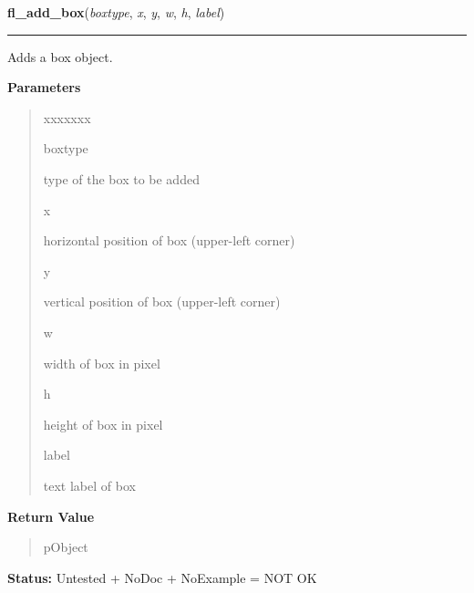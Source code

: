     \label{xformslib:library:fl_add_box}

    \vspace{0.5ex}

\hspace{.8\funcindent}\begin{boxedminipage}{\funcwidth}

    \raggedright \textbf{fl\_add\_box}(\textit{boxtype}, \textit{x}, \textit{y}, \textit{w}, \textit{h}, \textit{label})

    \vspace{-1.5ex}

    \rule{\textwidth}{0.5\fboxrule}
\setlength{\parskip}{2ex}
    Adds a box object.

\setlength{\parskip}{1ex}
      \textbf{Parameters}
      \vspace{-1ex}

      \begin{quote}
        \begin{Ventry}{xxxxxxx}

          \item[boxtype]

          type of the box to be added

          \item[x]

          horizontal position of box (upper-left corner)

          \item[y]

          vertical position of box (upper-left corner)

          \item[w]

          width of box in pixel

          \item[h]

          height of box in pixel

          \item[label]

          text label of box

        \end{Ventry}

      \end{quote}

      \textbf{Return Value}
    \vspace{-1ex}

      \begin{quote}
      pObject

      \end{quote}

\textbf{Status:} Untested + NoDoc + NoExample = NOT OK



    \end{boxedminipage}

